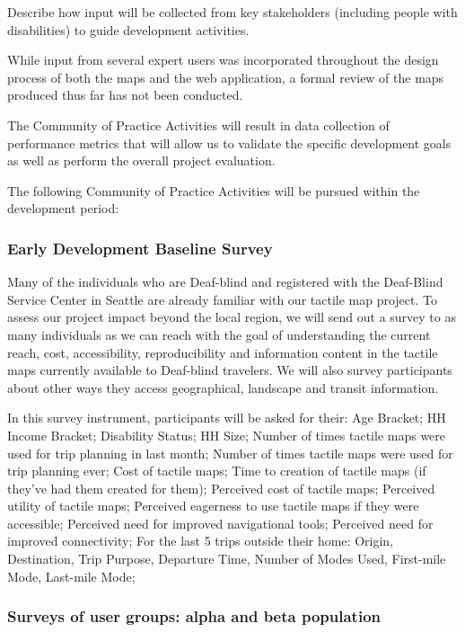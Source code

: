 Describe how input will be collected from key stakeholders (including people with disabilities) to guide development activities.

While input from several expert users was incorporated throughout the design process of both the maps and the web application, a formal review of the maps produced thus far has not been conducted. 


The Community of Practice Activities will result in data collection of performance metrics that will allow us to validate the specific development goals as well as perform the overall project evaluation.

The following Community of Practice Activities will be pursued within the development period:

\subsubsection{Early Development Baseline Survey}
\label{test:baseline}
Many of the individuals who are Deaf-blind and registered with the Deaf-Blind Service Center in Seattle are already familiar with our tactile map project. To assess our project impact beyond the local region, we will send out a survey to as many individuals as we can reach with the goal of understanding the current reach, cost, accessibility, reproducibility and information content in the tactile maps currently available to Deaf-blind travelers. We will also survey participants about other ways they access geographical, landscape and transit information. 

In this survey instrument, participants will be asked for their:  Age Bracket; HH Income Bracket; Disability Status; HH Size; Number of times tactile maps were used for trip planning in last month; Number of times tactile maps were used for trip planning ever; Cost of tactile maps; Time to creation of tactile maps (if they've had them created for them); Perceived cost of tactile maps; Perceived utility of tactile maps; Perceived eagerness to use tactile maps if they were accessible; Perceived need for improved navigational tools; Perceived need for improved connectivity; For the last 5 trips outside their home: Origin, Destination, Trip Purpose, Departure Time, Number of Modes Used, First-mile Mode, Last-mile Mode;

\subsubsection{Surveys of user groups: alpha and beta population}
\label{test:usersurvey}

